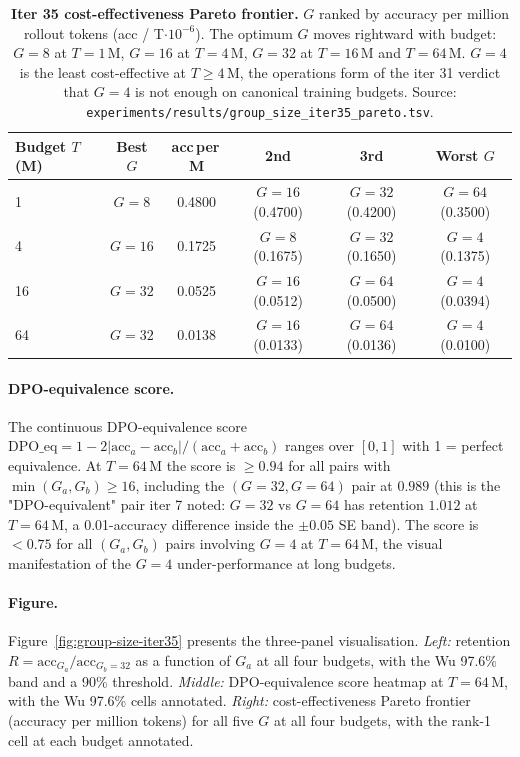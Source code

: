 \begin{table}[htbp]
\centering
\small
\begin{tabular}{lccccc}
\toprule
Budget $T$ (M) & Best $G$ & acc\,per\,M & 2nd & 3rd & Worst $G$ \\
\midrule
1   & $G{=}8$  & 0.4800 & $G{=}16$ (0.4700) & $G{=}32$ (0.4200) & $G{=}64$ (0.3500) \\
4   & $G{=}16$ & 0.1725 & $G{=}8$ (0.1675)  & $G{=}32$ (0.1650) & $G{=}4$ (0.1375) \\
16  & $G{=}32$ & 0.0525 & $G{=}16$ (0.0512) & $G{=}64$ (0.0500) & $G{=}4$ (0.0394) \\
64  & $G{=}32$ & 0.0138 & $G{=}16$ (0.0133) & $G{=}64$ (0.0136) & $G{=}4$ (0.0100) \\
\bottomrule
\end{tabular}
\caption{\textbf{Iter 35 cost-effectiveness Pareto frontier.}
$G$ ranked by accuracy per million rollout tokens (acc / T$\cdot10^{-6}$).
The optimum $G$ moves rightward with budget: $G{=}8$ at $T{=}1$\,M,
$G{=}16$ at $T{=}4$\,M, $G{=}32$ at $T{=}16$\,M and $T{=}64$\,M.
$G{=}4$ is the least cost-effective at $T \ge 4$\,M, the operations
form of the iter 31 verdict that $G{=}4$ is not enough on
canonical training budgets.  Source:
\texttt{experiments/results/group\_size\_iter35\_pareto.tsv}.}
\label{tab:groupsize-iter35-pareto}
\end{table}

\paragraph{DPO-equivalence score.}
The continuous DPO-equivalence score
$\mathrm{DPO\_eq} = 1 - 2 |\mathrm{acc}_a - \mathrm{acc}_b|
/ (\mathrm{acc}_a + \mathrm{acc}_b)$
ranges over $[0, 1]$ with 1 = perfect equivalence. At $T{=}64$\,M
the score is $\ge 0.94$ for all pairs with $\min(G_a, G_b) \ge 16$,
including the $(G{=}32, G{=}64)$ pair at $0.989$ (this is the
"DPO-equivalent" pair iter 7 noted: $G{=}32$ vs $G{=}64$ has
retention $1.012$ at $T{=}64$\,M, a 0.01-accuracy difference
inside the $\pm 0.05$ SE band). The score is $< 0.75$ for all
$(G_a, G_b)$ pairs involving $G{=}4$ at $T{=}64$\,M, the visual
manifestation of the $G{=}4$ under-performance at long budgets.

\paragraph{Figure.}
Figure~\ref{fig:group-size-iter35} presents the three-panel
visualisation. \emph{Left:} retention $R = \mathrm{acc}_{G_a} /
\mathrm{acc}_{G_b{=}32}$ as a function of $G_a$ at all four budgets,
with the Wu 97.6\% band and a 90\% threshold. \emph{Middle:}
DPO-equivalence score heatmap at $T{=}64$\,M, with the Wu 97.6\%
cells annotated. \emph{Right:} cost-effectiveness Pareto frontier
(accuracy per million tokens) for all five $G$ at all four budgets,
with the rank-1 cell at each budget annotated.

